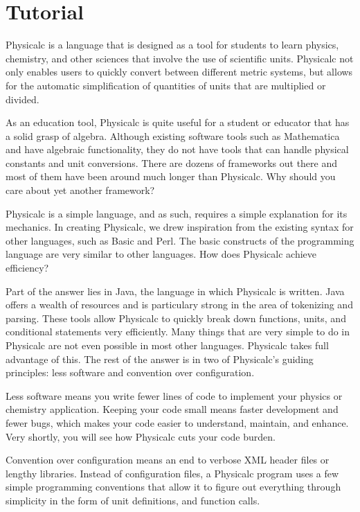 \chapter{Tutorial}

Physicalc is a language that is designed as a tool for students to
learn physics, chemistry, and other sciences that involve the use of
scientific units. Physicalc not only enables users to quickly convert
between different metric systems, but allows for the automatic
simplification of quantities of units that are multiplied or
divided. 

As an education tool, Physicalc is quite useful for a student or
educator that has a solid grasp of algebra. Although existing software
tools such as Mathematica and \cite{matlab} have algebraic functionality, they
do not have tools that can handle physical constants and unit
conversions. There are dozens of frameworks out there and most of them
have been around much longer than Physicalc. Why should you care about
yet another framework?

Physicalc is a simple language, and as such, requires a simple
explanation for its mechanics. In creating Physicalc, we drew
inspiration from the existing syntax for other languages, such as
Basic and Perl. The basic constructs of the programming language are
very similar to other languages. How does Physicalc achieve
efficiency?

Part of the answer lies in Java, the language in which Physicalc is
written. Java offers a wealth of resources and is particulary strong
in the area of tokenizing and parsing. These tools allow Physicalc to
quickly break down functions, units, and conditional statements very
efficiently. Many things that are very simple to do in Physicalc are
not even possible in most other languages. Physicalc takes full
advantage of this. The rest of the answer is in two of Physicalc's
guiding principles: less software and convention over configuration.

Less software means you write fewer lines of code to implement your
physics or chemistry application. Keeping your code small means faster
development and fewer bugs, which makes your code easier to
understand, maintain, and enhance. Very shortly, you will see how
Physicalc cuts your code burden.

Convention over configuration means an end to verbose XML header files
or lengthy libraries. Instead of configuration files, a Physicalc
program uses a few simple programming conventions that allow it to
figure out everything through simplicity in the form of unit
definitions, and function calls.

